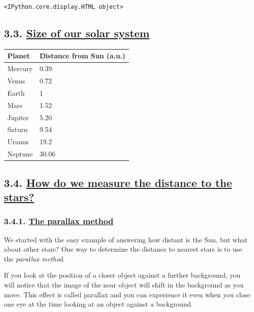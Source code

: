 \documentclass[
  letterpaper,
  DIV=11,
  numbers=noendperiod]{scrartcl}
\begin{document}
\begin{verbatim}
<IPython.core.display.HTML object>
\end{verbatim}

\hypertarget{size-of-our-solar-system}{%
\subsection{\texorpdfstring{3.3. \protect\hyperlink{toc0_}{Size of our
solar
system}}{3.3. Size of our solar system}}\label{size-of-our-solar-system}}

\begin{longtable}[]{@{}ll@{}}
\toprule\noalign{}
Planet & Distance from Sun (a.u.) \\
\midrule\noalign{}
\endhead
\bottomrule\noalign{}
\endlastfoot
Mercury & 0.39 \\
Venus & 0.72 \\
Earth & 1 \\
Mars & 1.52 \\
Jupiter & 5.20 \\
Saturn & 9.54 \\
Uranus & 19.2 \\
Neptune & 30.06 \\
\end{longtable}

\hypertarget{how-do-we-measure-the-distance-to-the-stars}{%
\subsection{\texorpdfstring{3.4. \protect\hyperlink{toc0_}{How do we
measure the distance to the
stars?}}{3.4. How do we measure the distance to the stars?}}\label{how-do-we-measure-the-distance-to-the-stars}}

\hypertarget{the-parallax-method}{%
\subsubsection{\texorpdfstring{3.4.1. \protect\hyperlink{toc0_}{The
parallax
method}}{3.4.1. The parallax method}}\label{the-parallax-method}}

We started with the easy example of answering how distant is the Sun,
but what about other stars? One way to determine the distance to nearest
stars is to use the \emph{parallax method}.

If you look at the position of a closer object against a further
background, you will notice that the image of the near object will shift
in the background as you move. This effect is called parallax and you
can experience it even when you close one eye at the time looking at an
object against a background.
\end{document}
